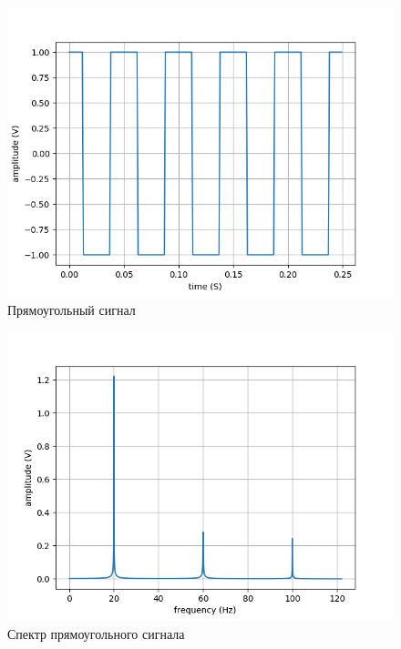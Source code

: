 \begin{figure}[H]
	\begin{center}
		\includegraphics[scale=0.7]{../out/square_time.png}
		\caption{Прямоугольный сигнал} 
		\label{pic:square_time} %
	\end{center}
\end{figure}

\begin{figure}[H]
	\begin{center}
		\includegraphics[scale=0.7]{../out/square_freq.png}
		\caption{Спектр прямоугольного сигнала} 
		\label{pic:square_freq} %
	\end{center}
\end{figure}

